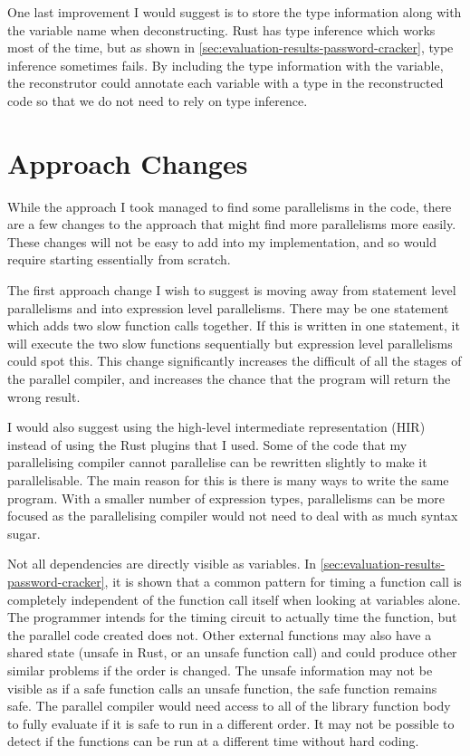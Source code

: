 One last improvement I would suggest is to store the type information along with the variable name when deconstructing. Rust has type inference which works most of the time, but as shown in \autoref{sec:evaluation-results-password-cracker}, type inference sometimes fails. By including the type information with the variable, the reconstrutor could annotate each variable with a type in the reconstructed code so that we do not need to rely on type inference.

\section{Approach Changes}
While the approach I took managed to find some parallelisms in the code, there are a few changes to the approach that might find more parallelisms more easily. These changes will not be easy to add into my implementation, and so would require starting essentially from scratch.

The first approach change I wish to suggest is moving away from statement level parallelisms and into expression level parallelisms. There may be one statement which adds two slow function calls together. If this is written in one statement, it will execute the two slow functions sequentially but expression level parallelisms could spot this. This change significantly increases the difficult of all the stages of the parallel compiler, and increases the chance that the program will return the wrong result.

I would also suggest using the high-level intermediate representation (HIR) instead of using the Rust plugins that I used. Some of the code that my parallelising compiler cannot parallelise can be rewritten slightly to make it parallelisable. The main reason for this is there is many ways to write the same program. With a smaller number of expression types, parallelisms can be more focused as the parallelising compiler would not need to deal with as much syntax sugar.

Not all dependencies are directly visible as variables. In \autoref{sec:evaluation-results-password-cracker}, it is shown that a common pattern for timing a function call is completely independent of the function call itself when looking at variables alone. The programmer intends for the timing circuit to actually time the function, but the parallel code created does not. Other external functions may also have a shared state (unsafe in Rust, or an unsafe function call) and could produce other similar problems if the order is changed. The unsafe information may not be visible as if a safe function calls an unsafe function, the safe function remains safe. The parallel compiler would need access to all of the library function body to fully evaluate if it is safe to run in a different order. It may not be possible to detect if the functions can be run at a different time without hard coding.
